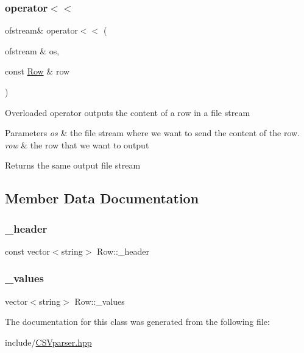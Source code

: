 \subsubsection{\texorpdfstring{operator$<$$<$}{operator<<}\hspace{0.1cm}{\footnotesize\ttfamily [2/2]}}
{\footnotesize\ttfamily ofstream\& operator$<$$<$ (\begin{DoxyParamCaption}\item[{ofstream \&}]{os,  }\item[{const \mbox{\hyperlink{class_row}{Row}} \&}]{row }\end{DoxyParamCaption})\hspace{0.3cm}{\ttfamily [friend]}}

Overloaded operator outputs the content of a row in a file stream 
\begin{DoxyParams}{Parameters}
{\em os} & the file stream where we want to send the content of the row. \\
\hline
{\em row} & the row that we want to output \\
\hline
\end{DoxyParams}
\begin{DoxyReturn}{Returns}
the same output file stream 
\end{DoxyReturn}


\subsection{Member Data Documentation}
\mbox{\label{class_row_a98603a15923aa97e15198393ef3080c0}} 
\subsubsection{\texorpdfstring{\_header}{\_header}}
{\footnotesize\ttfamily const vector$<$string$>$ Row\+::\+\_\+header\hspace{0.3cm}{\ttfamily [private]}}

\mbox{\label{class_row_ab064db33f941055c8d99a6f47eae733c}} 
\subsubsection{\texorpdfstring{\_values}{\_values}}
{\footnotesize\ttfamily vector$<$string$>$ Row\+::\+\_\+values\hspace{0.3cm}{\ttfamily [private]}}



The documentation for this class was generated from the following file\+:\begin{DoxyCompactItemize}
\item 
include/\mbox{\hyperlink{_c_s_vparser_8hpp}{C\+S\+Vparser.\+hpp}}\end{DoxyCompactItemize}
